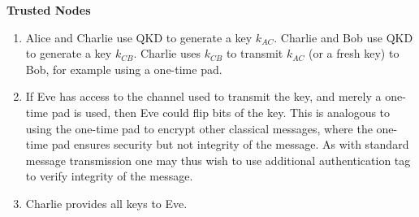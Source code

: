 \begin{exercises}
\item {\bf Trusted Nodes}

\begin{enumerate}
\item Alice and Charlie use QKD to generate a key $k_{AC}$. Charlie and Bob use QKD to generate a key $k_{CB}$. Charlie uses $k_{CB}$ to transmit $k_{AC}$ (or a fresh key) to Bob, for example using a one-time pad.

\item If Eve has access to the channel used to transmit the key, and merely a one-time pad is used, then Eve could flip bits of the key. This is analogous to using the one-time pad to encrypt other classical messages, where the one-time pad ensures security but not integrity of the message. As with standard message transmission one may thus wish to use additional authentication tag to verify integrity of the message.

\item Charlie provides all keys to Eve.
\end{enumerate}
\end{exercises}